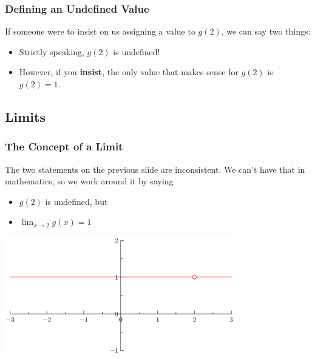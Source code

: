 \documentclass[serif,ignorenonframetext]{beamer}
\begin{document}
\begin{frame}
  \frametitle{Defining an Undefined Value}
  If someone were to insist on us assigning a value to $g(2)$,
  we can say two things:
  \begin{itemize}
  \item Strictly speaking, $g(2)$ is undefined!
  \item However, if you \textbf{insist}, the only value that makes
    sense for $g(2)$ is $g(2)=1$.
  \end{itemize}
\end{frame}

\subsection{Limits}

\begin{frame}
  \frametitle{The Concept of a Limit}
  The two statements on the previous slide are inconsistent.  We can't
  have that in mathematics, so we work around it by saying
  \begin{itemize}
  \item $g(2)$ is undefined, but
  \item $\displaystyle\lim_{x\to 2} g(x) = 1$
  \end{itemize}
  \begin{center}
    \includegraphics[width=0.75\textwidth]{graph2.eps}
  \end{center}
\end{frame}
\end{document}
